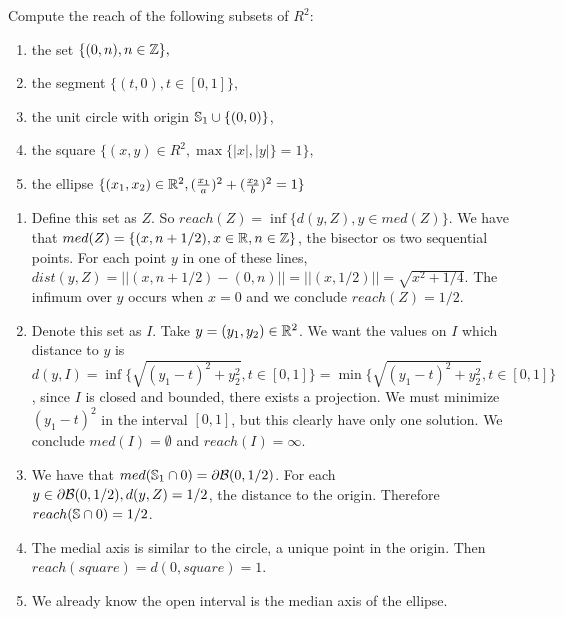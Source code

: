 \noindent\linia 

\begin{exercise}
    Compute the reach of the following subsets of $R^2$:
    \begin{enumerate}
        \item the set $\{(0, n), n \in \mathbb{Z}\},$
        \item the segment $\{(t, 0), t \in [0, 1]\},$
        \item the unit circle with origin $\mathbb{S}_1 \cup \{(0, 0)\}$,
        \item the square $\{(x, y) \in R^2, \max\{|x|, |y|\}  
        = 1\},$
        \item the ellipse $\{(x_1, x_2) \in \mathbb{R}^2, (\frac{x_1}{a})^2 +
        (\frac{x_2}{b})^2 = 1 \}$
    \end{enumerate}
\end{exercise}

\begin{enumerate}
    \item Define this set as $Z$. So $reach(Z) = \inf\{d(y,Z), y \in
    med(Z)\}$. We have that $med(Z) = \{(x,n+1/2), x \in \mathbb{R}, n \in \mathbb{Z}\}$, the
    bisector os two sequential points. For each point $y$ in one of these
    lines, $dist(y,Z) = ||(x,n+1/2) - (0,n)|| = ||(x,1/2)|| = \sqrt{x^2 +
    1/4}$. The infimum over $y$ occurs when $x = 0$ and we conclude $reach(Z)
    = 1/2$. 

    \item Denote this set as $I$. Take $y = (y_1, y_2) \in \mathbb{R}^2$. We want
    the values on $I$ which distance to $y$ is $d(y,I) = \inf\{\sqrt{(y_1 -
    t)^2 + y_2^2}, t \in [0,1] \} = \min\{\sqrt{(y_1 -
    t)^2 + y_2^2}, t \in [0,1] \}$, since $I$ is closed and bounded, there exists a projection. We must
    minimize $(y_1 - t)^2$ in the interval $[0,1]$, but this clearly have only
    one solution. We conclude $med(I) = \emptyset$ and $reach(I) = \infty$. 
    
    \item We have that $med(\mathbb{S}_1 \cap 0) = \partial\mathcal{B}(0,1/2)$. For each
    $y \in \partial\mathcal{B}(0,1/2), d(y,Z) = 1/2$, the distance to the origin.
    Therefore $reach(\mathbb{S} \cap 0) = 1/2$. 

    \item The medial axis is similar to the circle, a unique point in the
    origin. Then $reach(square) = d(0,square) = 1$. 

    \item We already know the open interval is the median axis of the ellipse. 

\end{enumerate}

